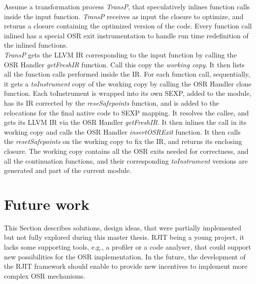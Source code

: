 Assume a transformation process \textit{TransP}, that speculatively inlines function calls inside the input function. 
\textit{TransP} receives as input the closure to optimize, and returns a closure containing the optimized version of the code.
Every function call inlined has a special OSR exit instrumentation to handle run time redefinition of the inlined functions.\\

\textit{TransP} gets the LLVM IR corresponding to the input function by calling the OSR Handler \textit{getFreshIR} function.
Call this copy the \textit{working copy}.
It then lists all the function calls performed inside the IR.
For each function call, sequentially, it gets a \textit{toInstrument} copy of the working copy by calling the OSR Handler clone function.
Each toInstrument is wrapped into its own SEXP, added to the module, has its IR corrected by the \textit{reseSafepoints} function, and is added to the relocations for the final native code to SEXP mapping.
It resolves the callee, and gets its LLVM IR via the OSR Handler \textit{getFreshIR}.
It then inlines the call in its working copy and calls the OSR Handler \textit{insertOSRExit} function.
It then calls the \textit{resetSafepoints} on the working copy to fix the IR, and returns its enclosing closure.
The working copy contains all the OSR exits needed for correctness, and all the continuation functions, and their corresponding \textit{toInstrument} versions are generated and part of the current module.\\


\section{Future work}
This Section describes solutions, design ideas, that were partially implemented but not fully explored during this master thesis.
RJIT being a young project, it lacks some supporting tools, e.g., a profiler or a code analyser, that could support new possibilities for the OSR implementation.
In the future, the development of the RJIT framework should enable to provide new incentives to implement more complex OSR mechanisms.\\

